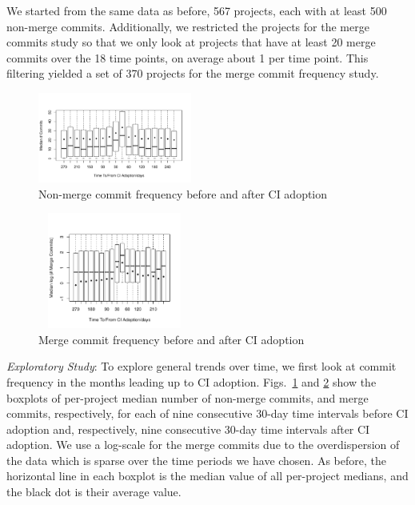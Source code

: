 We started from the same data as before, 567 projects, each with at least 500 
non-merge commits.
Additionally, we restricted the projects for the  merge commits study so that we only look at projects that have at least 20 merge commits over the 18 time points, \ie on average about 1 per time point.
This filtering yielded a set of 370 projects for the merge commit frequency study.

\begin{figure}[!t]
\centering
\includegraphics[width=0.45\textwidth, clip=true, trim=0 15 15 50]{numbercommits.pdf}
\caption{Non-merge commit frequency before and after CI adoption}
\label{Fig:NumberCommits}
\end{figure}

\begin{figure}[!t]
\centering
\includegraphics[width=0.45\textwidth, height=1.5in, clip=true, trim=0 15 15 50]{merges.pdf}
\caption{Merge commit frequency before and after CI adoption}
\label{Fig:MergeCommits}
\end{figure}

\smallskip\noindent \emph{Exploratory Study}: 
To explore general trends over time, we first look at commit frequency in 
the months leading up to CI adoption.
Figs.~\ref{Fig:NumberCommits} and \ref{Fig:MergeCommits} show the boxplots of per-project median 
number of non-merge commits, and merge commits, respectively, for each of nine consecutive 30-day time intervals 
before CI adoption and, respectively, nine consecutive 30-day time intervals 
after CI adoption.
We use a log-scale for the merge commits due to the overdispersion of the data which is sparse over the time periods we have chosen.
As before, the horizontal line in each boxplot is the median value of all 
per-project medians, and the black dot is their average value.

